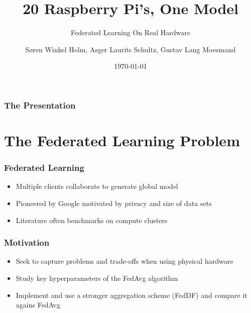 \documentclass{beamer}
\title{20 Raspberry Pi's, One Model}
\subtitle{
    Federated Learning On Real Hardware
}
\author[Søren Holm, Asger Schultz, Gustav Moesmand]
{Søren Winkel Holm, Asger Laurits Schultz, Gustav Lang Moesmand}
\institute[DTU]{Technical University of Denmark}
\date{\today}
\begin{document}
\begin{frame}
    \titlepage
\end{frame}

\begin{frame}
    \frametitle{The Presentation}
    \footnotesize
    \tableofcontents
\end{frame}

\section{The Federated Learning Problem}
\begin{frame}
	\frametitle{Federated Learning}
	\noindent
	\begin{itemize}
		\item Multiple clients collaborate to generate global model
		\item Pioneered by Google motivated by privacy and size of data sets
		\item Literature often benchmarks on compute clusters
	\end{itemize}
	\begin{figure}
    		\centering
		
	\end{figure}
\end{frame}

\begin{frame}
	\frametitle{Motivation}
			\begin{itemize}
				\item Seek to capture problems and trade-offs when using physical hardware
				\item Study key hyperparameters of the FedAvg algorithm
				\item Implement and use a stronger aggregation scheme (FedDF) and compare it agains FedAvg
			\end{itemize}
\end{frame}
\end{document}
